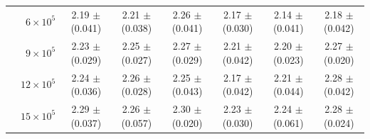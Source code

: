 \documentclass[10pt,journal,compsoc]{IEEEtran}
\begin{document}
\begin{table}
\begin{tabular}{c|r|c|c|c|c|c|c}
 & $6 \times 10^5 $ & 2.19 $\pm$ (0.041) & 2.21 $\pm$ (0.038) & 2.26 $\pm$ (0.041) & 2.17 $\pm$ (0.030) & 2.14 $\pm$ (0.041) & 2.18 $\pm$ (0.042)  \\
 & $9 \times 10^5 $ & 2.23 $\pm$ (0.029) & 2.25 $\pm$ (0.027) & 2.27 $\pm$ (0.029) & 2.21 $\pm$ (0.042) & 2.20 $\pm$ (0.023) & 2.27 $\pm$ (0.020)  \\
 & $12 \times 10^5 $ & 2.24 $\pm$ (0.036) & 2.26 $\pm$ (0.028) & 2.25 $\pm$ (0.043) & 2.17 $\pm$ (0.042) & 2.21 $\pm$ (0.044) & 2.28 $\pm$ (0.042)  \\
 & $15 \times 10^5 $ & 2.29 $\pm$ (0.037) & 2.26 $\pm$ (0.057) & 2.30 $\pm$ (0.020) & 2.23 $\pm$ (0.030) & 2.24 $\pm$ (0.061) & 2.28 $\pm$ (0.024) \\
\hline \hline
\end{tabular}
\vspace{-2ex}
\end{table}
\end{document}
